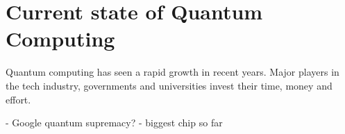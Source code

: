 \chapter{Current state of Quantum Computing}
Quantum computing has seen a rapid growth in recent years. Major players in the tech industry, governments and universities invest their time, money and effort.

- Google quantum supremacy?
- biggest chip so far


